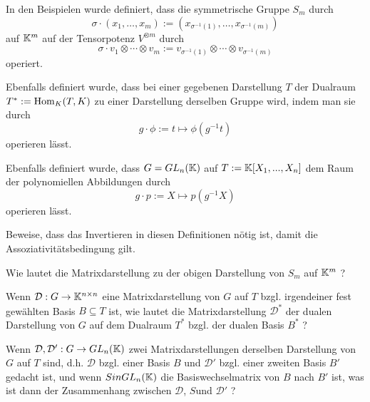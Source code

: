 \begin{sheet}

\begin{problem}[title={Komische Minus Einsen: Invertieren für die Assoziativitätsbedingung}, difficulty=leicht]\label{ex:invertieren_fuer_linksmoduln}
\begin{subproblem}
In den Beispielen wurde definiert, dass die symmetrische Gruppe $S_m$ durch
\[\sigma \cdot (x_1,\ldots,x_m) := (x_{\sigma^{-1}(1)}, \ldots, x_{\sigma^{-1}(m)})\]
auf $\mathbb{K}^m$ auf der Tensorpotenz $V^{\otimes m}$ durch
\[\sigma \cdot v_1\otimes\cdots\otimes v_m := v_{\sigma^{-1}(1)}\otimes \cdots \otimes v_{\sigma^{-1}(m)} \]
operiert.
\end{subproblem}
\begin{subproblem}
Ebenfalls definiert wurde, dass bei einer gegebenen Darstellung $T$ der Dualraum $T^\ast := \operatorname{Hom}_K(T,K)$ zu einer Darstellung derselben Gruppe wird, indem man sie durch
\[g\cdot \phi := t\mapsto \phi(g^{-1}t)\]
operieren lässt.
\end{subproblem}
\begin{subproblem}
Ebenfalls definiert wurde, dass $G=GL_n(\mathbb{K})$ auf $T:=\mathbb{K}[X_1, ..., X_n]$ dem Raum der polynomiellen Abbildungen durch
\[g\cdot p := X\mapsto p(g^{-1}X)\]
operieren lässt.
\end{subproblem}

Beweise, dass das Invertieren in diesen Definitionen nötig ist, damit die Assoziativitätsbedingung gilt.
\end{problem}

\begin{problem}[title={Darstellung der symmetrischen Gruppe mit Matrizen}]
Wie lautet die Matrixdarstellung zu der obigen Darstellung von $S_m$ auf $\mathbb{K}^m$ ?
\end{problem}

\begin{problem}[title={Dualisiere eine Matrixdarstellung}]
Wenn $\mathcal{D}: G\to\mathbb{K}^{n\times n}$ eine Matrixdarstellung von $G$ auf $T$ bzgl. irgendeiner fest gewählten Basis $B\subseteq T$ ist, wie lautet die Matrixdarstellung $\mathcal{D}^\ast$ der dualen Darstellung von $G$ auf dem Dualraum $T^\ast$ bzgl. der dualen Basis $B^\ast$ ?
\end{problem}

\begin{problem}[title={Basiswechsel einer Darstellung}]
Wenn $\mathcal{D}, \mathcal{D}': G\to GL_n(\mathbb{K})$ zwei Matrixdarstellungen derselben Darstellung von $G$ auf $T$ sind, d.h. $\mathcal{D}$ bzgl. einer Basis $B$ und $\mathcal{D}'$ bzgl. einer zweiten Basis $B'$ gedacht ist, und wenn $Sin GL_n(\mathbb{K})$ die Basiswechselmatrix von $B$ nach $B'$ ist, was ist dann der Zusammenhang zwischen $\mathcal{D}$, $S$und $\mathcal{D}'$ ?
\end{problem}


\end{sheet}
